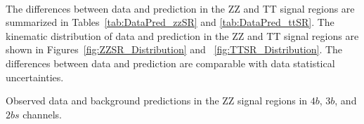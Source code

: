 \paragraph{}
The differences between data and prediction in the ZZ and TT signal regions are summarized in Tables~\ref{tab:DataPred_zzSR} and \ref{tab:DataPred_ttSR}. 
The kinematic distribution of data and prediction in the ZZ and TT signal regions are shown in Figures~\ref{fig:ZZSR_Distribution} and ~\ref{fig:TTSR_Distribution}.
The differences between data and prediction are comparable with data statistical uncertainties. 

% 

% 

% 

\begin{table}[htb!]
\caption{Observed data and background predictions in the ZZ signal regions in $4b$, $3b$, and $2bs$ channels.}
\begin{center}

\label{tab:DataPred_zzSR}
\end{center}
\end{table}

